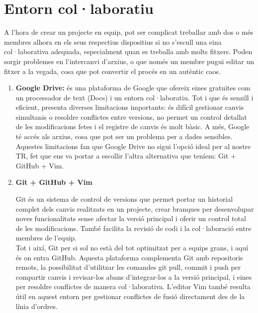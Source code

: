 \section{Entorn col·laboratiu}\label{sec:4.3}
A l’hora de crear un projecte en equip, pot ser complicat treballar amb dos o més membres alhora en els seus respectius dispositius si no s’escull una eina col·laborativa adequada, especialment quan es treballa amb molts fitxers. Poden sorgir problemes en l’intercanvi d’arxius, o que només un membre pugui editar un fitxer a la vegada, cosa que pot convertir el procés en un autèntic caos.

\begin{enumerate}
 \item \textbf{Google Drive: }és una plataforma de Google que ofereix eines gratuïtes com un processador de text (Docs) i un entorn col·laboratiu. Tot i que és senzill i eficient, presenta diverses limitacions importants: és difícil gestionar canvis simultanis o resoldre conflictes entre versions, no permet un control detallat de les modificacions fetes i el registre de canvis és molt bàsic. A més, Google té accés als arxius, cosa que pot ser un problema per a dades sensibles. Aquestes limitacions fan que Google Drive no sigui l’opció ideal per al nostre TR, fet que ens va portar a escollir l’altra alternativa que teníem: Git + GitHub + Vim.
\item \textbf{Git + GitHub + Vim}

Git és un sistema de control de versions \cite{ControlDeVersions} que permet portar un historial complet dels canvis realitzats en un projecte, crear branques per desenvolupar noves funcionalitats sense afectar la versió principal i oferir un control total de les modificacions. També facilita la revisió de codi i la col·laboració entre membres de l’equip.\\

Tot i així, Git per si sol no està del tot optimitzat per a equips grans, i aquí és on entra GitHub. Aquesta plataforma complementa Git amb repositoris remots, la possibilitat d’utilitzar les comandes git pull, commit i push per compartir canvis i revisar-los abans d’integrar-los a la versió principal, i eines per resoldre conflictes de manera col·laborativa. L’editor Vim \cite{Vim} també resulta útil en aquest entorn per gestionar conflictes de fusió directament des de la línia d’ordres.\\

\end{enumerate}
